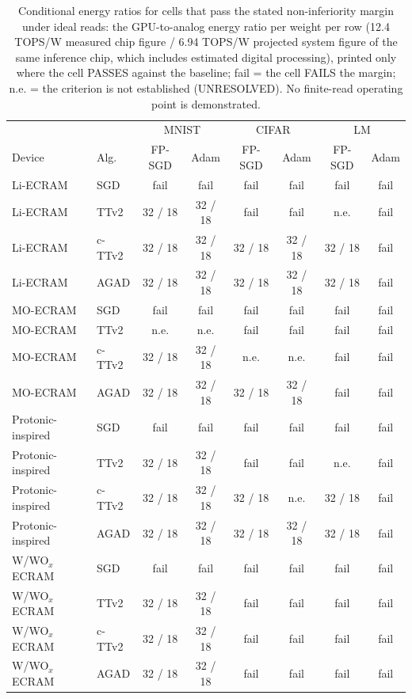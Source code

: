 \begin{table}[t]\centering\scriptsize\caption{Conditional energy ratios for cells that pass the stated non-inferiority margin under ideal reads: the GPU-to-analog energy ratio per weight per row (12.4 TOPS/W measured chip figure / 6.94 TOPS/W projected system figure of the same inference chip, which includes estimated digital processing), printed only where the cell PASSES against the baseline; fail = the cell FAILS the margin; n.e. = the criterion is not established (UNRESOLVED). No finite-read operating point is demonstrated.}\label{tab:rev_energy}
\begin{tabular}{llcccccc}\toprule & & \multicolumn{2}{c}{MNIST} & \multicolumn{2}{c}{CIFAR} & \multicolumn{2}{c}{LM}\\ Device & Alg. & FP-SGD & Adam & FP-SGD & Adam & FP-SGD & Adam\\\midrule
Li-ECRAM & SGD & fail & fail & fail & fail & fail & fail\\
Li-ECRAM & TTv2 & 32 / 18 & 32 / 18 & fail & fail & n.e. & fail\\
Li-ECRAM & c-TTv2 & 32 / 18 & 32 / 18 & 32 / 18 & 32 / 18 & 32 / 18 & fail\\
Li-ECRAM & AGAD & 32 / 18 & 32 / 18 & 32 / 18 & 32 / 18 & 32 / 18 & fail\\
MO-ECRAM & SGD & fail & fail & fail & fail & fail & fail\\
MO-ECRAM & TTv2 & n.e. & n.e. & fail & fail & fail & fail\\
MO-ECRAM & c-TTv2 & 32 / 18 & 32 / 18 & n.e. & n.e. & fail & fail\\
MO-ECRAM & AGAD & 32 / 18 & 32 / 18 & 32 / 18 & 32 / 18 & fail & fail\\
Protonic-inspired & SGD & fail & fail & fail & fail & fail & fail\\
Protonic-inspired & TTv2 & 32 / 18 & 32 / 18 & fail & fail & n.e. & fail\\
Protonic-inspired & c-TTv2 & 32 / 18 & 32 / 18 & 32 / 18 & n.e. & 32 / 18 & fail\\
Protonic-inspired & AGAD & 32 / 18 & 32 / 18 & 32 / 18 & 32 / 18 & 32 / 18 & fail\\
W/WO$_x$ ECRAM & SGD & fail & fail & fail & fail & fail & fail\\
W/WO$_x$ ECRAM & TTv2 & 32 / 18 & 32 / 18 & fail & fail & fail & fail\\
W/WO$_x$ ECRAM & c-TTv2 & 32 / 18 & 32 / 18 & fail & fail & fail & fail\\
W/WO$_x$ ECRAM & AGAD & 32 / 18 & 32 / 18 & fail & fail & fail & fail\\
\bottomrule\end{tabular}\end{table}
